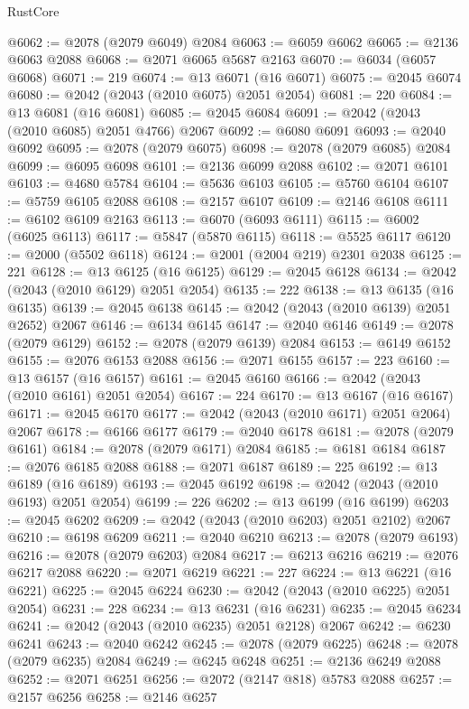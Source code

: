 \begin{lexlean}{RustCore}
\begin{coremodule}
@6062 := @2078 (@2079 @6049) @2084
@6063 := @6059 @6062
@6065 := @2136 @6063 @2088
@6068 := @2071 @6065 @5687 @2163
@6070 := @6034 (@6057 @6068)
@6071 := 219
@6074 := @13 @6071 (@16 @6071)
@6075 := @2045 @6074
@6080 := @2042 (@2043 (@2010 @6075) @2051 @2054)
@6081 := 220
@6084 := @13 @6081 (@16 @6081)
@6085 := @2045 @6084
@6091 := @2042 (@2043 (@2010 @6085) @2051 @4766) @2067
@6092 := @6080 @6091
@6093 := @2040 @6092
@6095 := @2078 (@2079 @6075)
@6098 := @2078 (@2079 @6085) @2084
@6099 := @6095 @6098
@6101 := @2136 @6099 @2088
@6102 := @2071 @6101
@6103 := @4680 @5784
@6104 := @5636 @6103
@6105 := @5760 @6104
@6107 := @5759 @6105 @2088
@6108 := @2157 @6107
@6109 := @2146 @6108
@6111 := @6102 @6109 @2163
@6113 := @6070 (@6093 @6111)
@6115 := @6002 (@6025 @6113)
@6117 := @5847 (@5870 @6115)
@6118 := @5525 @6117
@6120 := @2000 (@5502 @6118)
@6124 := @2001 (@2004 @219) @2301 @2038
@6125 := 221
@6128 := @13 @6125 (@16 @6125)
@6129 := @2045 @6128
@6134 := @2042 (@2043 (@2010 @6129) @2051 @2054)
@6135 := 222
@6138 := @13 @6135 (@16 @6135)
@6139 := @2045 @6138
@6145 := @2042 (@2043 (@2010 @6139) @2051 @2652) @2067
@6146 := @6134 @6145
@6147 := @2040 @6146
@6149 := @2078 (@2079 @6129)
@6152 := @2078 (@2079 @6139) @2084
@6153 := @6149 @6152
@6155 := @2076 @6153 @2088
@6156 := @2071 @6155
@6157 := 223
@6160 := @13 @6157 (@16 @6157)
@6161 := @2045 @6160
@6166 := @2042 (@2043 (@2010 @6161) @2051 @2054)
@6167 := 224
@6170 := @13 @6167 (@16 @6167)
@6171 := @2045 @6170
@6177 := @2042 (@2043 (@2010 @6171) @2051 @2064) @2067
@6178 := @6166 @6177
@6179 := @2040 @6178
@6181 := @2078 (@2079 @6161)
@6184 := @2078 (@2079 @6171) @2084
@6185 := @6181 @6184
@6187 := @2076 @6185 @2088
@6188 := @2071 @6187
@6189 := 225
@6192 := @13 @6189 (@16 @6189)
@6193 := @2045 @6192
@6198 := @2042 (@2043 (@2010 @6193) @2051 @2054)
@6199 := 226
@6202 := @13 @6199 (@16 @6199)
@6203 := @2045 @6202
@6209 := @2042 (@2043 (@2010 @6203) @2051 @2102) @2067
@6210 := @6198 @6209
@6211 := @2040 @6210
@6213 := @2078 (@2079 @6193)
@6216 := @2078 (@2079 @6203) @2084
@6217 := @6213 @6216
@6219 := @2076 @6217 @2088
@6220 := @2071 @6219
@6221 := 227
@6224 := @13 @6221 (@16 @6221)
@6225 := @2045 @6224
@6230 := @2042 (@2043 (@2010 @6225) @2051 @2054)
@6231 := 228
@6234 := @13 @6231 (@16 @6231)
@6235 := @2045 @6234
@6241 := @2042 (@2043 (@2010 @6235) @2051 @2128) @2067
@6242 := @6230 @6241
@6243 := @2040 @6242
@6245 := @2078 (@2079 @6225)
@6248 := @2078 (@2079 @6235) @2084
@6249 := @6245 @6248
@6251 := @2136 @6249 @2088
@6252 := @2071 @6251
@6256 := @2072 (@2147 @818) @5783 @2088
@6257 := @2157 @6256
@6258 := @2146 @6257

\end{coremodule}
\end{lexlean}
